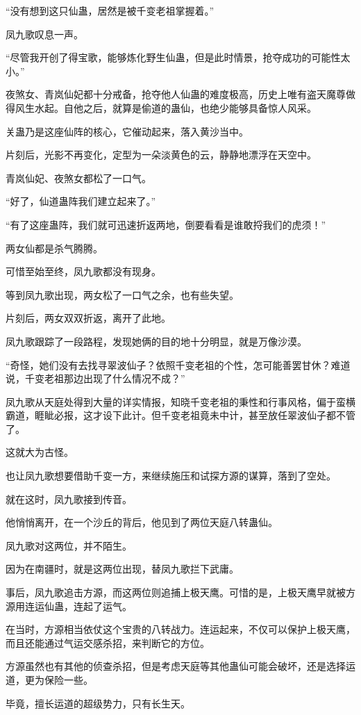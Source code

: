 \begin{this_body}
“没有想到这只仙蛊，居然是被千变老祖掌握着。”

凤九歌叹息一声。

“尽管我开创了得宝歌，能够炼化野生仙蛊，但是此时情景，抢夺成功的可能性太小。”

夜煞女、青岚仙妃都十分戒备，抢夺他人仙蛊的难度极高，历史上唯有盗天魔尊做得风生水起。自他之后，就算是偷道的蛊仙，也绝少能够具备惊人风采。

关蛊乃是这座仙阵的核心，它催动起来，落入黄沙当中。

片刻后，光影不再变化，定型为一朵淡黄色的云，静静地漂浮在天空中。

青岚仙妃、夜煞女都松了一口气。

“好了，仙道蛊阵我们建立起来了。”

“有了这座蛊阵，我们就可迅速折返两地，倒要看看是谁敢捋我们的虎须！”

两女仙都是杀气腾腾。

可惜至始至终，凤九歌都没有现身。

等到凤九歌出现，两女松了一口气之余，也有些失望。

片刻后，两女双双折返，离开了此地。

凤九歌跟踪了一段路程，发现她俩的目的地十分明显，就是万像沙漠。

“奇怪，她们没有去找寻翠波仙子？依照千变老祖的个性，怎可能善罢甘休？难道说，千变老祖那边出现了什么情况不成？”

凤九歌从天庭处得到大量的详实情报，知晓千变老祖的秉性和行事风格，偏于蛮横霸道，睚眦必报，这才设下此计。但千变老祖竟未中计，甚至放任翠波仙子都不管了。

这就大为古怪。

也让凤九歌想要借助千变一方，来继续施压和试探方源的谋算，落到了空处。

就在这时，凤九歌接到传音。

他悄悄离开，在一个沙丘的背后，他见到了两位天庭八转蛊仙。

凤九歌对这两位，并不陌生。

因为在南疆时，就是这两位出现，替凤九歌拦下武庸。

事后，凤九歌追击方源，而这两位则追捕上极天鹰。可惜的是，上极天鹰早就被方源用连运仙蛊，连起了运气。

在当时，方源相当依仗这个宝贵的八转战力。连运起来，不仅可以保护上极天鹰，而且还能通过气运交感杀招，来判断它的方位。

方源虽然也有其他的侦查杀招，但是考虑天庭等其他蛊仙可能会破坏，还是选择运道，更为保险一些。

毕竟，擅长运道的超级势力，只有长生天。


\end{this_body}
